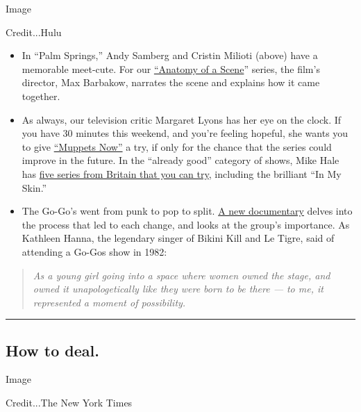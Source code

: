 Image

Credit...Hulu

\begin{itemize}
\item
  In ``Palm Springs,'' Andy Samberg and Cristin Milioti (above) have a
  memorable meet-cute. For our
  \href{https://www.nytimes.com/2020/07/31/movies/palm-springs-clip-hulu.html}{``Anatomy
  of a Scene}'' series, the film's director, Max Barbakow, narrates the
  scene and explains how it came together.
\item
  As always, our television critic Margaret Lyons has her eye on the
  clock. If you have 30 minutes this weekend, and you're feeling
  hopeful, she wants you to give
  \href{https://www.nytimes.com/2020/07/30/arts/television/muppets-disney-errol-morris-first-person.html}{``Muppets
  Now''} a try, if only for the chance that the series could improve in
  the future. In the ``already good'' category of shows, Mike Hale has
  \href{https://www.nytimes.com/2020/07/30/arts/television/in-my-skin-hulu.html}{five
  series from Britain that you can try}, including the brilliant ``In My
  Skin.''
\item
  The Go-Go's went from punk to pop to split.
  \href{https://www.nytimes.com/2020/07/29/arts/music/the-go-gos-documentary.html}{A
  new documentary} delves into the process that led to each change, and
  looks at the group's importance. As Kathleen Hanna, the legendary
  singer of Bikini Kill and Le Tigre, said of attending a Go-Gos show in
  1982:
\end{itemize}

\begin{quote}
\emph{As a young girl going into a space where women owned the stage,
and owned it unapologetically like they were born to be there --- to me,
it represented a moment of possibility.}
\end{quote}

\begin{center}\rule{0.5\linewidth}{\linethickness}\end{center}

\hypertarget{how-to-deal}{%
\subsection{How to deal.}\label{how-to-deal}}

Image

Credit...The New York Times

